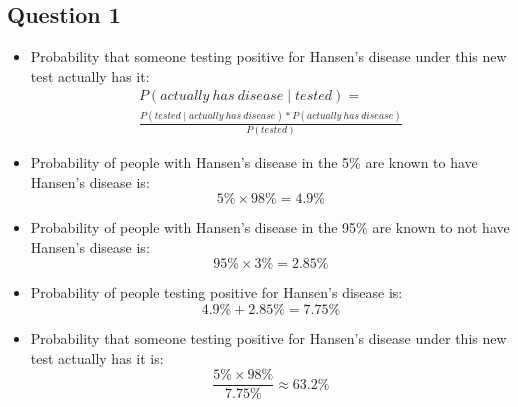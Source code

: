 \documentclass{article}
\begin{document}
    \subsection{Question 1}
        \begin{itemize}
            \item Probability that someone testing positive for Hansen’s disease under this new test actually has it:
               \begin{equation} \label{eq:1}
                    \begin{split}
                        P (actually \ has \ disease \mid tested) = \\ \frac{P(tested \mid actually \ has \ disease)*P(actually\ has \ disease)}{P(tested)} 
                    \end{split}
                \end{equation}
            \item Probability of people with Hansen's disease in the 5\% are known to have Hansen's disease is: 
                $$ 
                    5\%\times 98\% = 4.9\% 
                $$
            \item Probability of people with Hansen's disease in the 95\% are known to not have Hansen's disease is: 
                $$
                    95\%\times 3\%  = 2.85\% 
                $$
            \item Probability of people testing positive for Hansen's disease is: 
                $$ 
                    4.9\% + 2.85\% = 7.75\% 
                $$
            \item Probability that someone testing positive for Hansen’s disease under this new test actually has it is:
                $$
                    \frac{5\%\times 98\%}{7.75\%} \approx 63.2\%
                $$
            \end{itemize}
    
\end{document}
